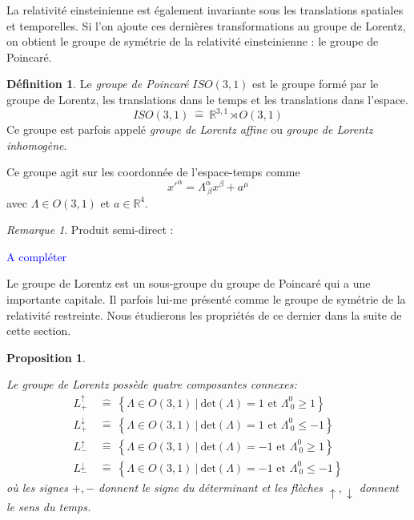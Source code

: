 \documentclass[a4paper,11pt]{report}
\theoremstyle{definition}
\theoremstyle{plain}
\newtheorem{prop}[thm]{Proposition}
\theoremstyle{definition}
\newtheorem{defn}{Définition}[chapter]
\theoremstyle{remark}
\newtheorem{rmk}{Remarque}[chapter]
\newcommand{\comp}{\begin{center}\textcolor{blue}{A compléter}\end{center}}
\begin{document}
            La relativité einsteinienne est également invariante sous les translations spatiales et temporelles. Si l'on ajoute ces dernières transformations au groupe de Lorentz, on obtient le groupe de symétrie de la relativité einsteinienne : le groupe de Poincaré.
            \begin{defn}
                Le \textit{groupe de Poincaré} $ISO(3,1)$ est le groupe formé par le groupe de Lorentz, les translations dans le temps et les translations dans l'espace.
                \begin{equation}
                    ISO(3,1) ~\hat{=}~ \mathbb{R}^{3,1}\rtimes O(3,1)
                \end{equation}
                Ce groupe est parfois appelé \textit{groupe de Lorentz affine} ou \textit{groupe de Lorentz inhomogène}.
            \end{defn}
            
            Ce groupe agit sur les coordonnée de l'espace-temps comme
            \begin{equation}
                x'^\alpha = \Lambda^\alpha_{~\beta}x^\beta + a^\mu
            \end{equation}
            avec $\Lambda\in O(3,1)$ et $a\in\mathbb{R}^4$.
            
            \begin{rmk}
                Produit semi-direct :
                \comp
            \end{rmk}
            
            Le groupe de Lorentz est un sous-groupe du groupe de Poincaré qui a une importante capitale. Il parfois lui-me présenté comme le groupe de symétrie de la relativité restreinte. Nous étudierons les propriétés de ce dernier dans la suite de cette section.
            
            \begin{prop}\begin{leftbar}
                Le groupe de Lorentz possède quatre composantes connexes:
                \begin{align}
                    L^\uparrow_+ &~\hat{=}~ \left\{\Lambda\in O(3,1)~\big|~\text{det}(\Lambda) = 1\text{ et }\Lambda^0_{~0}\geq1\right\} \\
                    L^\downarrow_+ &~\hat{=}~ \left\{\Lambda\in O(3,1)~\big|~\text{det}(\Lambda) = 1\text{ et }\Lambda^0_{~0}\leq -1\right\} \\
                    L^\uparrow_- &~\hat{=}~ \left\{\Lambda\in O(3,1)~\big|~\text{det}(\Lambda) = -1\text{ et }\Lambda^0_{~0}\geq1\right\} \\
                    L^\downarrow_- &~\hat{=}~ \left\{\Lambda\in O(3,1)~\big|~\text{det}(\Lambda) = -1\text{ et }\Lambda^0_{~0}\leq-1\right\}
                \end{align}
                où les signes $+,-$ donnent le signe du déterminant et les flèches $\uparrow,\downarrow$ donnent le sens du temps.
            \end{leftbar}\end{prop}
            
\end{document}
